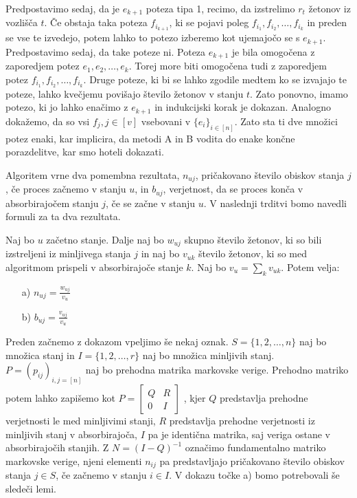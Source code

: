 \documentclass[twoside,11pt]{article}
\begin{document}
Predpostavimo sedaj, da je $e_{k+1}$ poteza tipa 1, recimo, da izstrelimo $r_{t}$ žetonov iz vozlišča $t$. Če obstaja taka poteza $f_{i_{k+1}}$, ki se pojavi poleg $f_{i_1},f_{i_2},\ldots,f_{i_k}$ in preden se vse te izvedejo, potem lahko to potezo izberemo kot ujemajočo se s $e_{k+1}$. Predpostavimo sedaj, da take poteze ni. Poteza $e_{k+1}$ je bila omogočena z zaporedjem potez $e_{1},e_{2},\ldots,e_{k}$. Torej more biti omogočena tudi z zaporedjem potez $f_{i_1},f_{i_2},\ldots,f_{i_k}$. Druge poteze, ki bi se lahko zgodile medtem ko se izvajajo te poteze, lahko kvečjemu povišajo število žetonov v stanju $t$. 
Zato ponovno, imamo potezo, ki jo lahko enačimo z $e_{k+1}$ in indukcijski korak je dokazan. Analogno dokažemo, da so vsi $f_{j}, j \in [v] $ vsebovani v $\{e_{i} \}_{i\in [n] }$. Zato sta ti dve množici potez enaki, kar implicira, da metodi A in B vodita do enake končne porazdelitve, kar smo hoteli dokazati.
\hfill \QED

\vspace{\baselineskip}

Algoritem vrne dva pomembna rezultata, $n_{uj}$, pričakovano število obiskov stanja $j$, če proces začnemo v stanju $u$, in $b_{uj}$, verjetnost, da se proces konča v absorbirajočem stanju $j$, če se začne v stanju $u$. V naslednji trditvi bomo navedli formuli za ta dva rezultata.

\begin{trditev}\label{formule}
    Naj bo $u$ začetno stanje. Dalje naj bo $w_{uj}$ skupno število žetonov, ki so bili izstreljeni iz minljivega stanja $j$ in naj bo $v_{uk}$ število žetonov, ki so med algoritmom prispeli v absorbirajoče stanje $k$. Naj bo $v_{u} = \sum_{k} v_{uk}$. Potem velja: 
    \begin{enumerate}
        \item[a)] $n_{uj} = \frac{w_{uj}}{v_{u}}$
        \item[b)] $b_{uj} = \frac{v_{uj}}{v_{u}}$
    \end{enumerate}

\end{trditev}


\noindent
Preden začnemo z dokazom vpeljimo še nekaj oznak. $S = \{1,2,\ldots,n\}$ naj bo množica stanj in $I = \{1,2,\ldots,r\}$ naj bo množica minljivih stanj. $P = (p_{ij})_{i,j=[n]}$ naj bo prehodna matrika markovske verige. Prehodno matriko potem lahko zapišemo kot 
$ P =
\begin{bmatrix} 
    Q & R \\
    0 & I 
\end{bmatrix}
$
    , kjer $Q$ predstavlja prehodne verjetnosti le med minljivimi stanji, $R$ predstavlja prehodne verjetnosti iz minljivih stanj v absorbirajoča, $I$ pa je identična matrika, saj veriga ostane v absorbirajočih stanjih. Z $N = (I-Q)^{-1}$ označimo fundamentalno matriko markovske verige, njeni elementi $n_{ij}$  pa predstavljajo pričakovano število obiskov stanja $j\in S$, če začnemo v stanju $i\in I$. V dokazu točke a) bomo potrebovali še sledeči lemi.  
\smallskip
\end{document}
